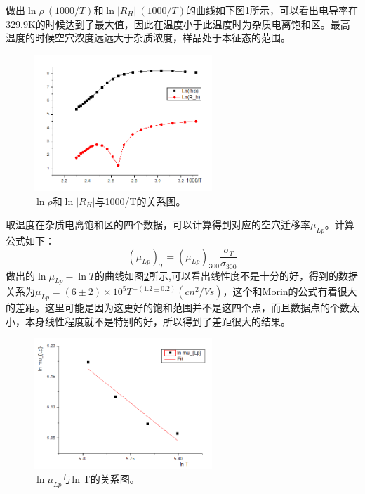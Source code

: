 \documentclass[aps,pre,12pt,preprint,onecolumn,showpacs,showkeys,UTF8]{revtex4-1}
\begin{document}
做出$\ln \rho ~ (1000/T)$和$\ln |R_H| ~ (1000/T)$的曲线如下图\ref{g:2}所示，可以看出电导率在329.9K的时候达到了最大值，因此在温度小于此温度时为杂质电离饱和区。最高温度的时候空穴浓度远远大于杂质浓度，样品处于本征态的范围。
\begin{figure}[ht]
	\begin{center}
		\includegraphics[width=0.6\textwidth]{pic2.png}
		\caption{\label{g:2}$\ln \rho$和$\ln |R_H|$与1000/T的关系图。}
	\end{center}
\end{figure}

取温度在杂质电离饱和区的四个数据，可以计算得到对应的空穴迁移率$\mu_{Lp}$。计算公式如下：
\begin{equation}
	(\mu_{Lp})_T=(\mu_{Lp})_{300}\frac{\sigma_T}{\sigma_{300}}
\end{equation}
做出的$\ln \mu_{Lp}-\ln T$的曲线如图\ref{g:3}所示,可以看出线性度不是十分的好，得到的数据关系为$\mu_{Lp}=(6\pm2)\times 10^5T^{-(1.2\pm0.2)}(cn^2/Vs)$，这个和Morin的公式有着很大的差距。这里可能是因为这更好的饱和范围并不是这四个点，而且数据点的个数太小，本身线性程度就不是特别的好，所以得到了差距很大的结果。
\begin{figure}[ht]
	\begin{center}
		\includegraphics[width=0.6\textwidth]{pic3.png}
		\caption{\label{g:3}$\ln \mu_{Lp}$与ln T的关系图。}
	\end{center}
\end{figure}
\end{document}
